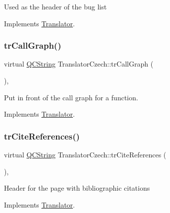 Used as the header of the bug list 

Implements \mbox{\hyperlink{class_translator}{Translator}}.

\mbox{\label{class_translator_czech_a655e2f987a1a8e57e46b98025cd0dfb7}} 
\subsubsection{\texorpdfstring{trCallGraph()}{trCallGraph()}}
{\footnotesize\ttfamily virtual \mbox{\hyperlink{class_q_c_string}{Q\+C\+String}} Translator\+Czech\+::tr\+Call\+Graph (\begin{DoxyParamCaption}{ }\end{DoxyParamCaption})\hspace{0.3cm}{\ttfamily [inline]}, {\ttfamily [virtual]}}

Put in front of the call graph for a function. 

Implements \mbox{\hyperlink{class_translator}{Translator}}.

\mbox{\label{class_translator_czech_a4a5a577ed4856ae95acd3c4e21016f79}} 
\subsubsection{\texorpdfstring{trCiteReferences()}{trCiteReferences()}}
{\footnotesize\ttfamily virtual \mbox{\hyperlink{class_q_c_string}{Q\+C\+String}} Translator\+Czech\+::tr\+Cite\+References (\begin{DoxyParamCaption}{ }\end{DoxyParamCaption})\hspace{0.3cm}{\ttfamily [inline]}, {\ttfamily [virtual]}}

Header for the page with bibliographic citations 

Implements \mbox{\hyperlink{class_translator}{Translator}}.

\mbox{\label{class_translator_czech_a989173fb73821cd05b9022d338528e6f}} 
